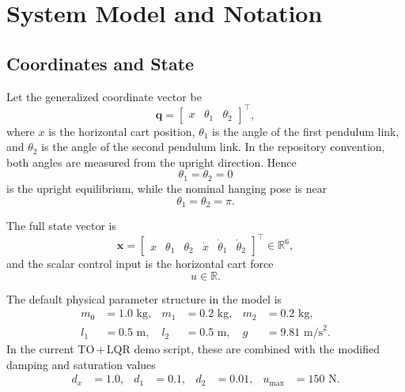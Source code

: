 \documentclass[conference]{IEEEtran}
\begin{document}
\section{System Model and Notation}
\subsection{Coordinates and State}
Let the generalized coordinate vector be
\begin{equation}
\bm{q} =
\begin{bmatrix}
x & \theta_1 & \theta_2
\end{bmatrix}^{\top},
\end{equation}
where $x$ is the horizontal cart position, $\theta_1$ is the angle of the first pendulum link, and $\theta_2$ is the angle of the second pendulum link. In the repository convention, both angles are measured from the upright direction. Hence
\begin{equation}
\theta_1 = \theta_2 = 0
\end{equation}
is the upright equilibrium, while the nominal hanging pose is near
\begin{equation}
\theta_1 = \theta_2 = \pi.
\end{equation}

The full state vector is
\begin{equation}
\bm{x} =
\begin{bmatrix}
x & \theta_1 & \theta_2 & \dot{x} & \dot{\theta}_1 & \dot{\theta}_2
\end{bmatrix}^{\top}
\in \mathbb{R}^{6},
\end{equation}
and the scalar control input is the horizontal cart force
\begin{equation}
u \in \mathbb{R}.
\end{equation}

The default physical parameter structure in the model is
\begin{align}
m_0 &= 1.0 \text{ kg}, &
m_1 &= 0.2 \text{ kg}, &
m_2 &= 0.2 \text{ kg}, \\
l_1 &= 0.5 \text{ m}, &
l_2 &= 0.5 \text{ m}, &
g &= 9.81 \text{ m/s}^2.
\end{align}
In the current TO\,+\,LQR demo script, these are combined with the modified damping and saturation values
\begin{align}
d_x &= 1.0, &
d_1 &= 0.1, &
d_2 &= 0.01, &
u_{\max} &= 150 \text{ N}.
\end{align}
\end{document}
